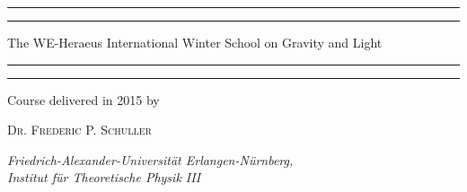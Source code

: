 \documentclass[11pt,oneside]{book}
\theoremstyle{definition} %
\theoremstyle{plain} %
\theoremstyle{remark} %
\theoremstyle{underline}
\begin{document}

\frontmatter

\begin{titlepage}
	\centering
	    \scshape %
        \vspace*{\baselineskip} %
        
	    \rule{\textwidth}{1.6pt}\vspace*{-\baselineskip}\vspace*{2pt} %
	    \rule{\textwidth}{0.4pt} %
	    
	    \vspace{0.75\baselineskip} %
	    
	    {\LARGE The WE-Heraeus International Winter School on Gravity and Light} %
	    
	    \vspace{0.75\baselineskip} %
	    
	    \rule{\textwidth}{0.4pt}\vspace*{-\baselineskip}\vspace{3.2pt} %
	    \rule{\textwidth}{1.6pt} %
	    
        \vspace{2\baselineskip} %

	    Course delivered in 2015 by 
	
	    \vspace{0.5\baselineskip} %
	
	    {\scshape\Large Dr. Frederic P. Schuller} %
	
	    \vspace{0.5\baselineskip} %
	
	    \textit{Friedrich-Alexander-Universität Erlangen-Nürnberg, \\ Institut für Theoretische Physik III} %
	    
	    \vspace{2\baselineskip} %
	    

\end{titlepage}
\end{document}
